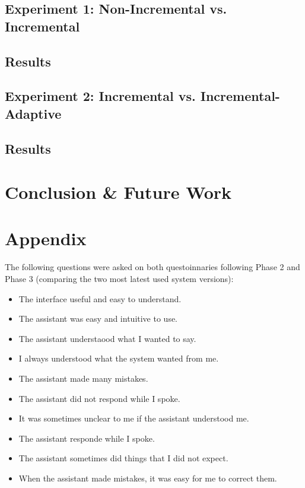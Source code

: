 \documentclass[11pt]{article}
\begin{document}
\subsection{Experiment 1: Non-Incremental vs. Incremental}
\label{section:exp1}

\subsection{Results}

\subsection{Experiment 2: Incremental vs. Incremental-Adaptive}
\label{section:exp2}

\subsection{Results}

\section{Conclusion \& Future Work}

\section*{Appendix}

The following questions were asked on both questoinnaries following Phase 2 and Phase 3 (comparing the two most latest used system versions):
\begin{itemize}
 \item The interface useful and easy to understand.
 \item The assistant was easy and intuitive to use.
 \item The assistant understaood what I wanted to say.
 \item I always understood what the system wanted from me. 
 \item The assistant made many mistakes. 
 \item The assistant did not respond while I spoke.
 \item It was sometimes unclear to me if the assistant understood me. 
 \item The assistant responde while I spoke. 
 \item The assistant sometimes did things that I did not expect.
 \item When the assistant made mistakes, it was easy for me to correct them. 
\end{itemize}
\end{document}

